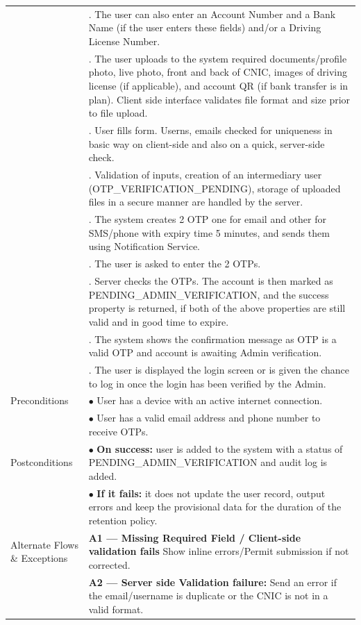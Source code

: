 \begin{longtable}{|>{\raggedright\arraybackslash}p{4cm}|>{\raggedright\arraybackslash}p{11cm}|}
& 2. The user can also enter an Account Number and a Bank Name (if the user enters these fields) and/or a Driving License Number. \\
& 3. The user uploads to the system required documents/profile photo, live photo, front and back of CNIC, images of driving license (if applicable), and account QR (if bank transfer is in plan). Client side interface validates file format and size prior to file upload. \\
& 4. User fills form. Userns, emails checked for uniqueness in basic way on client-side and also on a quick, server-side check. \\
& 5. Validation of inputs, creation of an intermediary user (OTP_VERIFICATION_PENDING), storage of uploaded files in a secure manner are handled by the server. \\
& 6. The system creates 2 OTP one for email and other for SMS/phone with expiry time 5 minutes, and sends them using Notification Service. \\
& 7. The user is asked to enter the 2 OTPs. \\
& 8. Server checks the OTPs. The account is then marked as PENDING_ADMIN_VERIFICATION, and the success property is returned, if both of the above properties are still valid and in good time to expire. \\
& 9. The system shows the confirmation message as OTP is a valid OTP and account is awaiting Admin verification. \\
& 10. The user is displayed the login screen or is given the chance to log in once the login has been verified by the Admin. \\
\hline
Preconditions & $\bullet$ User has a device with an active internet connection. \\
& $\bullet$ User has a valid email address and phone number to receive OTPs. \\
\hline
Postconditions & $\bullet$ \textbf{On success:} user is added to the system with a status of PENDING_ADMIN_VERIFICATION and audit log is added. \\
& $\bullet$ \textbf{If it fails:} it does not update the user record, output errors and keep the provisional data for the duration of the retention policy. \\
\hline
Alternate Flows \& Exceptions & \textbf{A1 — Missing Required Field / Client-side validation fails} \newline Show inline errors/Permit submission if not corrected. \\
& \textbf{A2 — Server side Validation failure:} \newline Send an error if the email/username is duplicate or the CNIC is not in a valid format. \\

\end{longtable}
